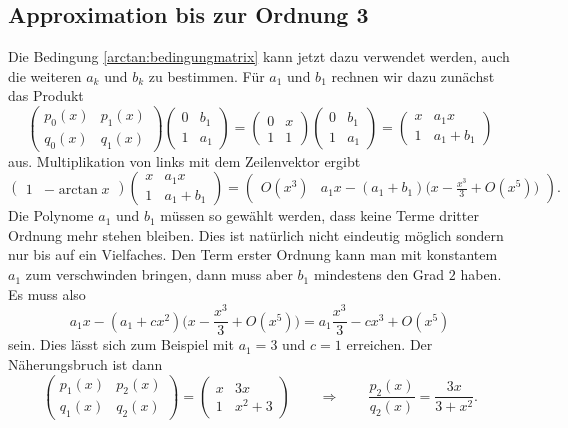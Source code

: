 \begin{refsection}
\subsection{Approximation bis zur Ordnung 3}
Die Bedingung \eqref{arctan:bedingungmatrix} kann jetzt dazu verwendet werden,
auch die weiteren $a_k$ und $b_k$ zu bestimmen.
Für $a_1$ und $b_1$ rechnen wir dazu zunächst das Produkt
\[
\begin{pmatrix}
p_0(x)&p_1(x)\\
q_0(x)&q_1(x)
\end{pmatrix}
\begin{pmatrix}
0&b_1\\
1&a_1
\end{pmatrix}
=
\begin{pmatrix}
0&x\\
1&1
\end{pmatrix}
\begin{pmatrix}
0&b_1\\
1&a_1
\end{pmatrix}
=
\begin{pmatrix}
x&a_1x\\
1&a_1+b_1
\end{pmatrix}
\]
aus. 
Multiplikation von links mit dem Zeilenvektor ergibt
\[
\begin{pmatrix}
1&-\arctan x
\end{pmatrix}
\begin{pmatrix}
x&a_1x\\
1&a_1+b_1
\end{pmatrix}
=
\begin{pmatrix}
O(x^3) & a_1x - (a_1+b_1)\biggl(\displaystyle x-\frac{x^3}3+O(x^5)\biggr)
\end{pmatrix}.
\]
Die Polynome $a_1$ und $b_1$ müssen so gewählt werden, dass keine Terme
dritter Ordnung mehr stehen bleiben.
Dies ist natürlich nicht eindeutig möglich sondern nur bis auf ein
Vielfaches.
Den Term erster Ordnung kann man mit konstantem $a_1$ zum verschwinden
bringen, dann muss aber $b_1$ mindestens den Grad $2$ haben.
Es muss also
\[
a_1x-(a_1+cx^2)\biggl(x-\frac{x^3}3+O(x^5)\biggr)
=
a_1\frac{x^3}{3}-cx^3 + O(x^5)
\]
sein.
Dies lässt sich zum Beispiel mit $a_1=3$ und $c=1$ erreichen.
Der Näherungsbruch ist dann
\[
\begin{pmatrix}
p_1(x)&p_2(x)\\
q_1(x)&q_2(x)
\end{pmatrix}
=
\begin{pmatrix}
x&3x\\
1&x^2+3
\end{pmatrix}
\qquad\Rightarrow\qquad
\frac{p_2(x)}{q_2(x)} = \frac{3x}{3+x^2}.
\]


\end{refsection}
